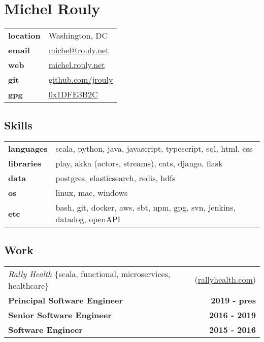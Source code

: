 \documentclass[10pt,letterpaper]{article}
\begin{document}
\setcounter{secnumdepth}{0}

\section{Michel Rouly}


\begin{tabularx}{\textwidth}{@{}lX@{}}
  \textbf{location} & Washington, DC \\
  \textbf{email} & \href{mailto:michel@rouly.net}{michel@rouly.net} \\
  \textbf{web} & \href{https://michel.rouly.net}{michel.rouly.net} \\
  \textbf{git} & \href{https://github.com/jrouly}{github.com/jrouly} \\
  \textbf{gpg} & \href{http://keys.gnupg.net/pks/lookup?op=get\&search=0x68E925EE1DFE3B2C}{0x1DFE3B2C}
\end{tabularx}


\subsection{Skills}

\noindent
\begin{tabularx}{\textwidth}{@{}lX@{}}
  \textbf{languages} & scala, python, java, javascript, typescript, sql, html, css \\
  \textbf{libraries} & play, akka (actors, streams), cats, django, flask \\
  \textbf{data} & postgres, elasticsearch, redis, hdfs \\
  \textbf{os} & linux, mac, windows \\
  \textbf{etc} & bash, git, docker, aws, sbt, npm, gpg, svn, jenkins, datadog, openAPI
\end{tabularx}


\subsection{Work}


\noindent\begin{tabularx}{\textwidth}{@{}X r@{}}
  \textit{Rally Health} \{scala, functional, microservices, healthcare\} & (\href{https://rallyhealth.com}{rallyhealth.com}) \\
  \textbf{Principal Software Engineer} & \textbf{2019 - pres} \\
  \textbf{Senior Software Engineer} & \textbf{2016 - 2019} \\
  \textbf{Software Engineer} & \textbf{2015 - 2016} \\
\end{tabularx}
\end{document}
